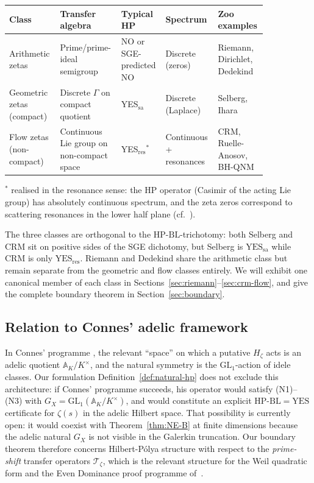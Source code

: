 \documentclass[11pt]{article}
\theoremstyle{definition}
\theoremstyle{remark}
\newcommand{\HBL}{\mathrm{HP\text{-}BL}}
\begin{document}
\begin{center}
\small
\setlength{\tabcolsep}{3pt}
\renewcommand{\arraystretch}{1.18}
\begin{tabular}{@{}p{0.19\linewidth} p{0.18\linewidth} p{0.12\linewidth} p{0.18\linewidth} p{0.17\linewidth}@{}}
\toprule
\textbf{Class} & \textbf{Transfer algebra} & \textbf{Typical HP} & \textbf{Spectrum} & \textbf{Zoo examples} \\
\midrule
Arithmetic zetas & Prime/prime-ideal semigroup & NO or SGE-predicted NO & Discrete (zeros) & Riemann, Dirichlet, Dedekind \\
Geometric zetas (compact) & Discrete $\Gamma$ on compact quotient & YES$_{\mathrm{sa}}$ & Discrete (Laplace) & Selberg, Ihara \\
Flow zetas (non-compact) & Continuous Lie group on non-compact space & YES$_{\mathrm{res}}{}^*$ & Continuous + resonances & CRM, Ruelle-Anosov, BH-QNM \\
\bottomrule
\end{tabular}
\end{center}
${}^*$ realised in the resonance sense: the HP operator (Casimir of
the acting Lie group) has absolutely continuous spectrum, and the
zeta zeros correspond to scattering resonances in the lower half
plane (cf.~\cite{DyatlovZworski2019}).

The three classes are orthogonal to the $\HBL$-trichotomy: both
Selberg and CRM sit on positive sides of the SGE dichotomy, but
Selberg is $\mathrm{YES}_{\mathrm{sa}}$ while CRM is only
$\mathrm{YES}_{\mathrm{res}}$. Riemann and
Dedekind share the arithmetic class but remain separate from the
geometric and flow classes entirely. We will exhibit one canonical
member of each class in
Sections~\ref{sec:riemann}--\ref{sec:crm-flow}, and give the
complete boundary theorem in Section~\ref{sec:boundary}.

\subsection{Relation to Connes' adelic framework}

In Connes' programme \cite{Connes1999, Connes2026}, the relevant
``space'' on which a putative $H_\zeta$ acts is an adelic quotient
$\mathbb{A}_K / K^\times$, and the natural symmetry is the
$\mathrm{GL}_1$-action of idele classes. Our formulation
Definition~\ref{def:natural-hp} does not exclude this architecture:
if Connes' programme succeeds, his operator would satisfy (N1)--(N3)
with $G_X = \mathrm{GL}_1(\mathbb{A}_K/K^\times)$, and would
constitute an explicit $\HBL = \mathrm{YES}$ certificate for
$\zeta(s)$ in the adelic Hilbert space. That possibility is currently
open: it would coexist with Theorem~\ref{thm:NE-B} at finite
dimensions because the adelic natural $G_X$ is not visible in the
Galerkin truncation. Our boundary theorem therefore concerns
Hilbert-P\'olya structure with respect to the \emph{prime-shift}
transfer operators $\mathcal{T}_\zeta$, which is the relevant
structure for the Weil quadratic form and the Even Dominance proof programme
of~\cite{Geiger2026RHII}.
\end{document}
